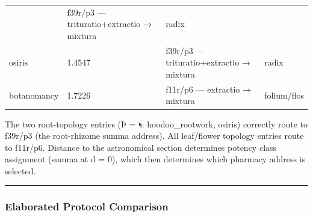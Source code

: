 \documentclass[12pt,a4paper]{article}
\begin{document}
\begin{longtable}[]{@{}llll@{}}
\begin{minipage}[t]{0.22\columnwidth}
\end{minipage} & \begin{minipage}[t]{0.22\columnwidth}\raggedright
f39r/p3 --- trituratio+extractio → mixtura\strut
\end{minipage} & \begin{minipage}[t]{0.22\columnwidth}\raggedright
radix\strut
\end{minipage}\tabularnewline
\begin{minipage}[t]{0.22\columnwidth}\raggedright
osiris\strut
\end{minipage} & \begin{minipage}[t]{0.22\columnwidth}\raggedright
1.4547\strut
\end{minipage} & \begin{minipage}[t]{0.22\columnwidth}\raggedright
f39r/p3 --- trituratio+extractio → mixtura\strut
\end{minipage} & \begin{minipage}[t]{0.22\columnwidth}\raggedright
radix\strut
\end{minipage}\tabularnewline
\begin{minipage}[t]{0.22\columnwidth}\raggedright
botanomancy\strut
\end{minipage} & \begin{minipage}[t]{0.22\columnwidth}\raggedright
1.7226\strut
\end{minipage} & \begin{minipage}[t]{0.22\columnwidth}\raggedright
f11r/p6 --- extractio → mixtura\strut
\end{minipage} & \begin{minipage}[t]{0.22\columnwidth}\raggedright
folium/flos\strut
\end{minipage}\tabularnewline
\bottomrule
\end{longtable}

The two root-topology entries (Þ = 𐑰: hoodoo\_rootwork, osiris)
correctly route to f39r/p3 (the root-rhizome summa address). All
leaf/flower topology entries route to f11r/p6. Distance to the
astronomical section determines potency class assignment (summa at d =
0), which then determines which pharmacy address is selected.

\begin{center}\rule{0.5\linewidth}{0.5pt}\end{center}

\hypertarget{elaborated-protocol-comparison}{%
\subsubsection{Elaborated Protocol
Comparison}\label{elaborated-protocol-comparison}}
\end{document}
